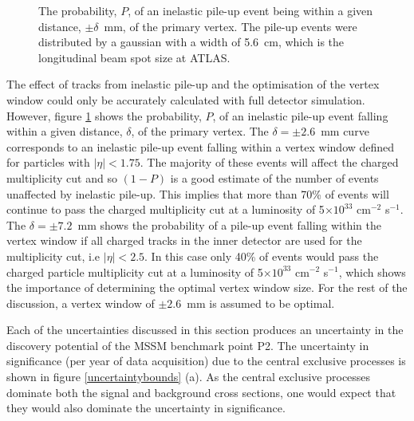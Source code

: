 \begin{figure}[t]
\centering
	
\caption[The probability of an inelastic pile-up event being within a given distance of the primary vertex]{The probability, $P$, of an inelastic pile-up event being within a given distance, $\pm \delta$~mm, of the primary vertex. The pile-up events were distributed by a gaussian with a width of 5.6~cm, which is the longitudinal beam spot size at ATLAS.\label{probpileupvertex}}
\end{figure}


The effect of tracks from inelastic pile-up and the optimisation of the vertex window could only be accurately calculated with full detector simulation. However, figure \ref{probpileupvertex} shows the probability, $P$, of an inelastic pile-up event falling within a given distance, $\delta$, of the primary vertex. The $\delta=\pm2.6$~mm curve corresponds to an inelastic pile-up event falling within a vertex window defined for particles with $|\eta|<1.75$. The majority of these events will affect the charged multiplicity cut and so $(1-P)$ is a good estimate of the number of events unaffected by inelastic pile-up. This implies that more than 70\% of events will continue to pass the charged multiplicity cut at a luminosity of 5$\times 10^{33}$ cm$^{-2}$ s$^{-1}$. The $\delta=\pm7.2$~mm shows the probability of a pile-up event falling within the vertex window if all charged tracks in the inner detector are used for the multiplicity cut, i.e $|\eta| < 2.5$. In this case only 40\% of events would pass the charged particle multiplicity cut at a luminosity of 5$\times 10^{33}$ cm$^{-2}$ s$^{-1}$, which shows the importance of determining the optimal vertex window size.
For the rest of the discussion, a vertex window of $\pm2.6$~mm is assumed to be optimal. 

Each of the uncertainties discussed in this section produces an uncertainty in the discovery potential of the MSSM benchmark point P2. The uncertainty in significance (per year of data acquisition) due to the central exclusive processes is shown in figure \ref{uncertaintybounds} (a). As the central exclusive processes dominate both the signal and background cross sections, one would expect that they would also dominate the uncertainty in significance.


